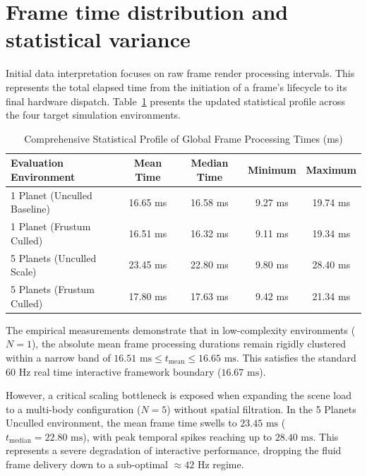 \documentclass[12pt]{report}
\begin{document}
\section{Frame time distribution and statistical variance}
Initial data interpretation focuses on raw frame render processing intervals. This represents the total elapsed time from the initiation of a frame's lifecycle to its final hardware dispatch. Table~\ref{tab:extended_frame_time_analysis} presents the updated statistical profile across the four target simulation environments.

\begin{table}[htbp]
    \centering
    \caption{Comprehensive Statistical Profile of Global Frame Processing Times (ms)}
    \label{tab:extended_frame_time_analysis}
    \vspace{0.5em}
    \begin{tabular}{lcccc}
        \hline
        \textbf{Evaluation Environment} & \textbf{Mean Time} & \textbf{Median Time} & \textbf{Minimum} & \textbf{Maximum} \\ \hline
        1 Planet (Unculled Baseline)    & 16.65 ms & 16.58 ms & 9.27 ms  & 19.74 ms \\ 
        1 Planet (Frustum Culled)       & 16.51 ms & 16.32 ms & 9.11 ms  & 19.34 ms \\ 
        5 Planets (Unculled Scale)      & 23.45 ms & 22.80 ms & 9.80 ms  & 28.40 ms \\ 
        5 Planets (Frustum Culled)      & 17.80 ms & 17.63 ms & 9.42 ms  & 21.34 ms \\ \hline
    \end{tabular}
\end{table}

The empirical measurements demonstrate that in low-complexity environments ($N=1$), the absolute mean frame processing durations remain rigidly clustered within a narrow band of $16.51\text{ ms} \le t_{\text{mean}} \le 16.65\text{ ms}$. This satisfies the standard $60\text{ Hz}$ real time interactive framework boundary ($16.67\text{ ms}$). 

However, a critical scaling bottleneck is exposed when expanding the scene load to a multi-body configuration ($N=5$) without spatial filtration. In the 5 Planets Unculled environment, the mean frame time swells to $23.45\text{ ms}$ ($t_{\text{median}} = 22.80\text{ ms}$), with peak temporal spikes reaching up to $28.40\text{ ms}$. This represents a severe degradation of interactive performance, dropping the fluid frame delivery down to a sub-optimal $\approx 42\text{ Hz}$ regime. 
\end{document}
